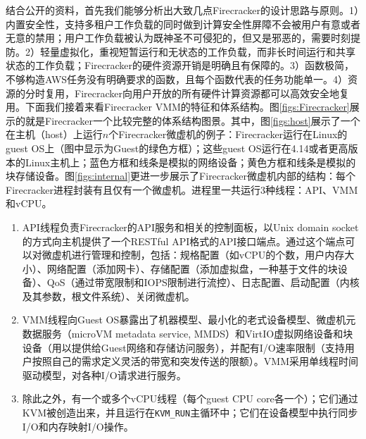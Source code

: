 \documentclass[11pt]{article}
\begin{document}
结合公开的资料，首先我们能够分析出大致几点Firecracker的设计思路与原则。1）内置安全性，支持多租户工作负载的同时做到计算安全性屏障不会被用户有意或者无意的禁用；用户工作负载被认为既神圣不可侵犯的，但又是邪恶的，需要时刻提防。2）轻量虚拟化，重视短暂运行和无状态的工作负载，而非长时间运行和共享状态的工作负载；Firecracker的硬件资源开销是明确且有保障的。3）函数极简，不够构造AWS任务没有明确要求的函数，且每个函数代表的任务功能单一。4）资源的分时复用，Firecracker向用户开放的所有硬件计算资源都可以高效安全地复用。下面我们接着来看Firecracker VMM的特征和体系结构。图\ref{figs:Firecracker}展示的就是Firecracker一个比较完整的体系结构图景。其中，图\ref{figs:host}展示了一个在主机（host）上运行$ n $个Firecracker微虚机的例子：Firecracker运行在Linux的guest OS上（图中显示为Guest的绿色方框）；这些guest OS运行在4.14或者更高版本的Linux主机上；蓝色方框和线条是模拟的网络设备；黄色方框和线条是模拟的块存储设备。图\ref{figs:internal}更进一步展示了Firecracker微虚机内部的结构：每个Firecracker进程封装有且仅有一个微虚机。进程里一共运行3种线程：API、VMM和vCPU。
\begin{enumerate}
	\item API线程负责Firecracker的API服务和相关的控制面板，以Unix domain socket的方式向主机提供了一个RESTful API格式的API接口端点。通过这个端点可以对微虚机进行管理和控制，包括：规格配置（如vCPU的个数，用户内存大小）、网络配置（添加网卡）、存储配置（添加虚拟盘，一种基于文件的块设备）、QoS（通过带宽限制和IOPS限制进行流控）、日志配置、启动配置（内核及其参数，根文件系统）、关闭微虚机。
	\item VMM线程向Guest OS暴露出了机器模型、最小化的老式设备模型、微虚机元数据服务（microVM metadata service, MMDS）和VirtIO虚拟网络设备和块设备（用以提供给Guest网络和存储访问服务），并配有I/O速率限制（支持用户按照自己的需求定义灵活的带宽和突发传送的限额）。VMM采用单线程时间驱动模型，对各种I/O请求进行服务。
	\item 除此之外，有一个或多个vCPU线程（每个guest CPU core各一个）；它们通过KVM被创造出来，并且运行在\texttt{KVM\_RUN}主循环中；它们在设备模型中执行同步I/O和内存映射I/O操作。
\end{enumerate}
\end{document}
